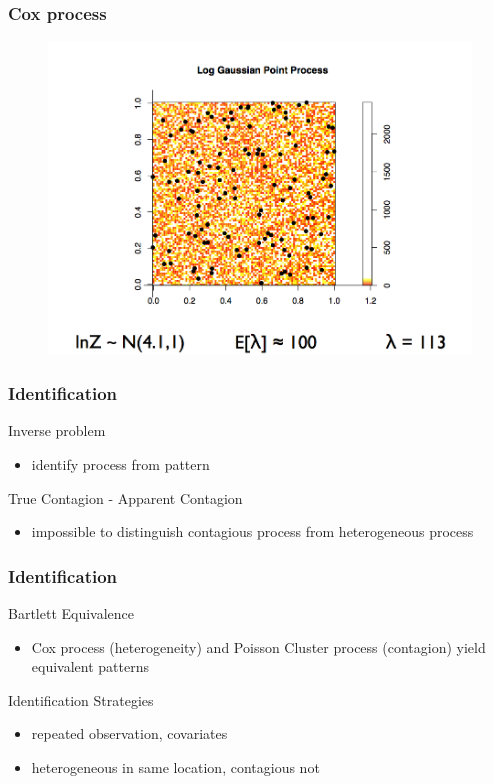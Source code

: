 \documentclass[nototal,handout]{beamer}
\begin{document}
\begin{frame}
	\frametitle{Cox process}
 \begin{figure}[ht]
  \centering
  \includegraphics[scale=0.20]{cox.png}
  \end{figure}
 \end{frame} 



\begin{frame}
  \frametitle{Identification}
  \begin{block}{Inverse problem}
    \begin{itemize}
      \item identify process from pattern
    \end{itemize}
   \end{block}
 \begin{block}{True Contagion - Apparent Contagion}
    \begin{itemize}
      \item impossible to distinguish contagious process from heterogeneous process
    \end{itemize}
   \end{block}
\end{frame}

\begin{frame}
  \frametitle{Identification}
  \begin{block}{Bartlett Equivalence}
    \begin{itemize}
      \item Cox process (heterogeneity) and Poisson Cluster process
	(contagion) yield equivalent patterns
    \end{itemize}
   \end{block}
\begin{block}{Identification Strategies}
    \begin{itemize}
      \item repeated observation, covariates
      \item heterogeneous in same location, contagious not
    \end{itemize}
   \end{block}


 \end{frame}
\end{document}
